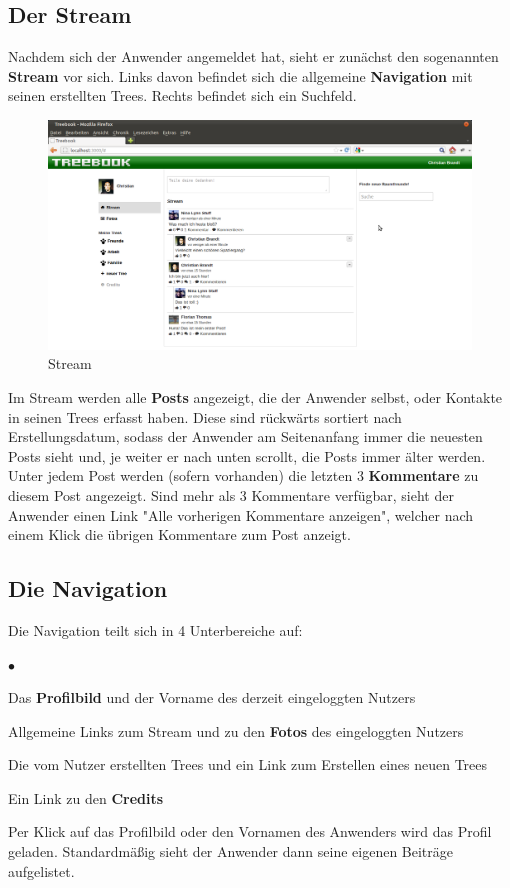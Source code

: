 \documentclass[10pt,a4paper]{book}
\makeatletter
\def\ScaleIfNeeded{%
\ifdim\Gin@nat@width>\linewidth
\linewidth
\else
\Gin@nat@width
\fi
}
\makeatother
\begin{document}
\subsection{Der Stream}
Nachdem sich der Anwender angemeldet hat, sieht er zunächst den sogenannten \textbf{Stream} vor sich. Links davon befindet sich die allgemeine \textbf{Navigation} mit seinen erstellten Trees. Rechts befindet sich ein Suchfeld.
\begin{figure}[htbp]
\centering
\includegraphics[width=\ScaleIfNeeded]{Pictures/screen_stream.png}%
\caption{Stream}%
\end{figure}
Im Stream werden alle \textbf{Posts} angezeigt, die der Anwender selbst, oder Kontakte in seinen Trees erfasst haben. Diese sind rückwärts sortiert nach Erstellungsdatum, sodass der Anwender am Seitenanfang immer die neuesten Posts sieht und, je weiter er nach unten scrollt, die Posts immer älter werden.
Unter jedem Post werden (sofern vorhanden) die letzten 3 \textbf{Kommentare} zu diesem Post angezeigt. Sind mehr als 3 Kommentare verfügbar, sieht der Anwender einen Link "Alle vorherigen Kommentare anzeigen", welcher nach einem Klick die übrigen Kommentare zum Post anzeigt.
\subsection{Die Navigation}
Die Navigation teilt sich in 4 Unterbereiche auf:
\begin{list}{$\bullet$}{}
\item Das \textbf{Profilbild} und der Vorname des derzeit eingeloggten Nutzers
\item Allgemeine Links zum Stream und zu den \textbf{Fotos} des eingeloggten Nutzers
\item Die vom Nutzer erstellten Trees und ein Link zum Erstellen eines neuen Trees
\item Ein Link zu den \textbf{Credits}
\end{list}
Per Klick auf das Profilbild oder den Vornamen des Anwenders wird das Profil geladen. Standardmäßig sieht der Anwender dann seine eigenen Beiträge aufgelistet.
\end{document}
